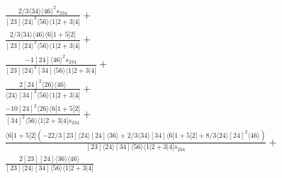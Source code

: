\documentclass[varwidth, border=5pt]{standalone}
\begin{document}
\begin{my}
$\begin{gathered}
\scriptscriptstyle\frac{2/3⟨34⟩⟨46⟩^2s_{234}}{[23]⟨24⟩^3⟨56⟩⟨1|2+3|4]}+\\
\scriptscriptstyle\frac{2/3⟨34⟩⟨46⟩⟨6|1+5|2]}{[23]⟨24⟩^2⟨56⟩⟨1|2+3|4]}+\\
\scriptscriptstyle\frac{-1[24]⟨46⟩^2s_{234}}{[23]⟨24⟩^2[34]⟨56⟩⟨1|2+3|4]}+\\
\scriptscriptstyle\frac{2[24]^2⟨26⟩⟨46⟩}{⟨24⟩[34]^2⟨56⟩⟨1|2+3|4]}+\\
\scriptscriptstyle\frac{-10[24]^2⟨26⟩⟨6|1+5|2]}{[34]^2⟨56⟩⟨1|2+3|4]s_{234}}+\\
\scriptscriptstyle\frac{⟨6|1+5|2](-22/3[23]⟨24⟩[24]⟨36⟩+2/3⟨34⟩[34]⟨6|1+5|2]+8/3⟨24⟩[24]^2⟨46⟩)}{[23]⟨24⟩[34]⟨56⟩⟨1|2+3|4]s_{234}}+\\
\scriptscriptstyle\frac{2[23][24]⟨36⟩⟨46⟩}{[23]⟨24⟩[34]⟨56⟩⟨1|2+3|4]}\phantom{+}
\end{gathered}$
\end{my}
\end{document}
